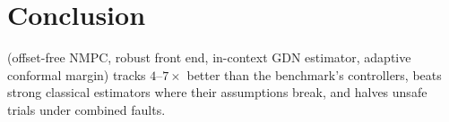 \section{Conclusion}
\label{sec:conclusion}
\ours{} (offset-free NMPC, robust front end, in-context GDN estimator, adaptive conformal margin) tracks $4$--$7\times$ better than the benchmark's controllers, beats strong classical estimators where their assumptions break, and halves unsafe trials under combined faults.
